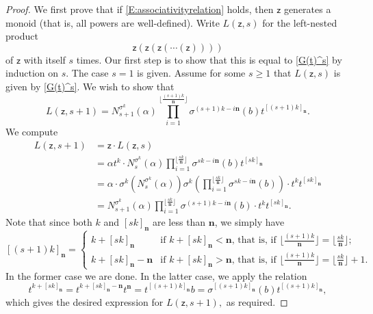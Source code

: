 \documentclass[11pt]{amsart}
\theoremstyle{plain}
\theoremstyle{definition}
\numberwithin{equation}{section}
\numberwithin{figure}{section}
\newcommand{\scz}{\mathsf{z}}  %
\newcommand{\de}{\mathbf{n}}  %
\begin{document}
\begin{proof}
We first prove that if \eqref{E:associativityrelation} holds, then $\scz$ generates a monoid (that is, all powers are well-defined).
    Write $L(\scz,s)$ for the left-nested product
    $$
    \scz(\scz(\scz( \cdots (\scz))))
    $$
    of $\scz$ with itself $s$ times.
    Our first step is to show that this is equal to \eqref{G(t)^s} by induction on $s$.  The case $s=1$ is given.  Assume for some $s\geq 1$ that $L(\scz,s)$ is given by \eqref{G(t)^s}.  We wish to show that
    \begin{equation}\label{E:Lzs+1}
    L(\scz,s+1)= N_{s+1}^{\sigma^k}(\alpha)\prod_{i=1}^{\lfloor \frac{(s+1)k}{\de}\rfloor} \sigma^{(s+1)k-i\de}(b)t^{[(s+1)k]_{\de}}.
    \end{equation}
    We compute
    \begin{align*}
    L(\scz,s+1) &= \scz \cdot L(\scz,s)\\
    &=\alpha t^k \cdot N_{s}^{\sigma^k}(\alpha)\prod_{i=1}^{\lfloor \frac{sk}{\de}\rfloor} \sigma^{sk-i\de}(b)t^{[sk]_{\de}} \\
    &= \alpha \cdot \sigma^k\left( N_{s}^{\sigma^k}(\alpha)\right) \sigma^k\left(\prod_{i=1}^{\lfloor \frac{sk}{\de}\rfloor} \sigma^{sk-i\de}(b)\right)\cdot t^kt^{[sk]_{\de}}\\
    &= N_{s+1}^{\sigma^k}(\alpha) \prod_{i=1}^{\lfloor \frac{sk}{\de}\rfloor} \sigma^{(s+1)k-i\de}(b)\cdot t^kt^{[sk]_{\de}}.
    \end{align*}
    Note that since both $k$ and $[sk]_{\de}$ are less than $\de$, we simply have
    $$
    [(s+1)k]_{\de} = \begin{cases}
        k+[sk]_{\de} & \text{if $k+[sk]_{\de}<\de$, that is, if $\lfloor \frac{(s+1)k}{\de}\rfloor=\lfloor \frac{sk}{\de}\rfloor$};\\
        k+[sk]_{\de}-\de & \text{if $k+[sk]_{\de} > \de$, that is, if $\lfloor \frac{(s+1)k}{\de}\rfloor=\lfloor \frac{sk}{\de}\rfloor+1$.}
    \end{cases}
    $$
    In the former case we are done.  In the latter case, we apply the relation
    $$
    t^{k+[sk]_{\de}} = t^{k+[sk]_{\de}-\de}t^{\de}= t^{[(s+1)k]_{\de}}b=\sigma^{[(s+1)k]_{\de}}(b)t^{[(s+1)k]_{\de}},
    $$
    which gives the desired expression for $L(\scz,s+1),$  as required.


\end{proof}
\end{document}

